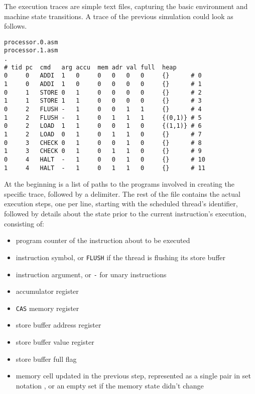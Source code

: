 The execution traces are simple text files, capturing the basic environment and machine state transitions.
A trace of the previous simulation could look as follows.

\begin{lstlisting}[language={[concubine]Assembler}, caption={Simple Output Trace}, label={lst:trace:simple}, xleftmargin=\parindent]
processor.0.asm
processor.1.asm
.
# tid pc  cmd   arg accu  mem adr val full  heap
0     0   ADDI  1   0     0   0   0   0     {}      # 0
1     0   ADDI  1   0     0   0   0   0     {}      # 1
0     1   STORE 0   1     0   0   0   0     {}      # 2
1     1   STORE 1   1     0   0   0   0     {}      # 3
0     2   FLUSH -   1     0   0   1   1     {}      # 4
1     2   FLUSH -   1     0   1   1   1     {(0,1)} # 5
0     2   LOAD  1   1     0   0   1   0     {(1,1)} # 6
1     2   LOAD  0   1     0   1   1   0     {}      # 7
0     3   CHECK 0   1     0   0   1   0     {}      # 8
1     3   CHECK 0   1     0   1   1   0     {}      # 9
0     4   HALT  -   1     0   0   1   0     {}      # 10
1     4   HALT  -   1     0   1   1   0     {}      # 11
\end{lstlisting}

At the beginning is a list of paths to the programs involved in creating the specific trace, followed by a delimiter.
The rest of the file contains the actual execution steps, one per line, starting with the scheduled thread's identifier, followed by details about the state prior to the current instruction's execution, consisting of:

\begin{itemize}
  \item program counter of the instruction about to be executed
  \item instruction symbol, or \texttt{FLUSH} if the thread is flushing its store buffer
  \item instruction argument, or \texttt{-} for unary instructions
  \item accumulator register
  \item \texttt{CAS} memory register
  \item store buffer address register
  \item store buffer value register
  \item store buffer full flag
  \item memory cell updated in the previous step, represented as a single pair in set notation \texttt{}, or an empty set \texttt{\string{\string}} if the memory state didn't change
\end{itemize}

